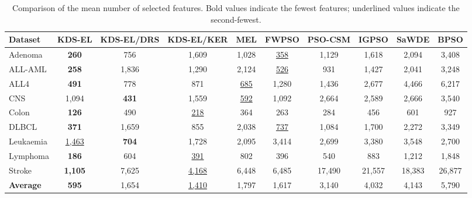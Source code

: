 \documentclass[a4paper,fleqn]{cas-dc}
\begin{document}
\begin{sloppypar}
\begin{table}[t]
\centering
\caption{Comparison of the mean number of selected features.
Bold values indicate the fewest features; underlined values indicate the second-fewest.}
\label{tab:features}
\setlength{\tabcolsep}{3.5pt}
\begin{tabular}{lccccccccc}
\toprule
\textbf{Dataset} & \textbf{KDS-EL} & \textbf{KDS-EL/DRS} & \textbf{KDS-EL/KER} & \textbf{MEL} & \textbf{FWPSO} & \textbf{PSO-CSM} & \textbf{IGPSO} & \textbf{SaWDE} & \textbf{BPSO} \\
\midrule
Adenoma & \textbf{260} & 756 & 1,609 & 1,028 & \underline{358} & 1,129 & 1,618 & 2,094 & 3,408 \\
ALL-AML & \textbf{258} & 1,836 & 1,290 & 2,124 & \underline{526} & 931 & 1,427 & 2,041 & 3,248 \\
ALL4 & \textbf{491} & 778 & 871 & \underline{685} & 1,280 & 1,436 & 2,677 & 4,466 & 6,217 \\
CNS & 1,094 & \textbf{431} & 1,559 & \underline{592} & 1,092 & 2,664 & 2,589 & 2,666 & 3,540 \\
Colon & \textbf{126} & 490 & \underline{218} & 364 & 263 & 284 & 456 & 601 & 927 \\
DLBCL & \textbf{371} & 1,659 & 855 & 2,038 & \underline{737} & 1,084 & 1,700 & 2,272 & 3,349 \\
Leukaemia & \underline{1,463} & \textbf{704} & 1,728 & 2,095 & 3,414 & 2,699 & 3,380 & 3,548 & 2,700 \\
Lymphoma & \textbf{186} & 604 & \underline{391} & 802 & 396 & 540 & 883 & 1,212 & 1,848 \\
Stroke & \textbf{1,105} & 7,625 & \underline{4,168} & 6,448 & 6,485 & 17,490 & 21,557 & 18,383 & 26,877 \\
\midrule
\textbf{Average} & \textbf{595} & 1,654 & \underline{1,410} & 1,797 & 1,617 & 3,140 & 4,032 & 4,143 & 5,790 \\
\bottomrule
\end{tabular}
\end{table}


\end{sloppypar}
\end{document}
